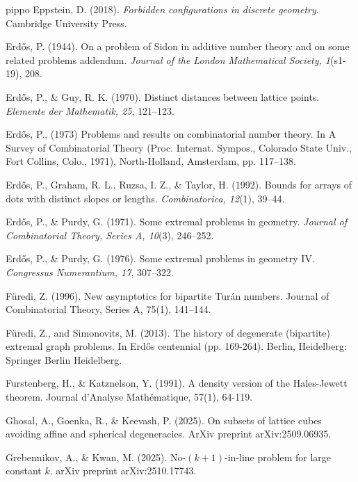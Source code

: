 \documentclass[11pt]{article}
\theoremstyle{plain}
\begin{document}
\begin{thebibliography}{pippo}
		 Eppstein, D. (2018). \textit{Forbidden configurations in discrete geometry}. Cambridge University Press.
		
		 Erdős, P. (1944). On a problem of Sidon in additive number theory and on some related problems addendum. \textit{Journal of the London Mathematical Society, 1}(s1-19), 208.
		
		 Erdős, P., \& Guy, R. K. (1970). Distinct distances between lattice points. \textit{Elemente der Mathematik, 25}, 121–123.
		
		 Erdős, P., (1973) Problems and results on combinatorial number theory. In A Survey of
		Combinatorial Theory (Proc. Internat. Sympos., Colorado State Univ., Fort Collins, Colo., 1971),
		North-Holland, Amsterdam, pp. 117–138.
		
		 Erdős, P., Graham, R. L., Ruzsa, I. Z., \& Taylor, H. (1992). Bounds for arrays of dots with distinct slopes or lengths. \textit{Combinatorica, 12}(1), 39–44. %
		
		 Erdős, P., \& Purdy, G. (1971). Some extremal problems in geometry. \textit{Journal of Combinatorial Theory, Series A, 10}(3), 246–252. %
		
		 Erdős, P., \& Purdy, G. (1976). Some extremal problems in geometry IV. \textit{Congressus Numerantium, 17}, 307–322.
		
		 Füredi, Z. (1996). New asymptotics for bipartite Turán numbers. Journal of Combinatorial Theory, Series A, 75(1), 141–144.
		
		 Füredi, Z., and Simonovits, M. (2013). The history of degenerate (bipartite) extremal graph problems. In Erdős centennial (pp. 169-264). Berlin, Heidelberg: Springer Berlin Heidelberg.
		
		 Furstenberg, H., \& Katznelson, Y. (1991). A density version of the Hales-Jewett theorem. Journal d’Analyse Mathématique, 57(1), 64-119.
		
		 Ghosal, A., Goenka, R., \& Keevash, P. (2025). On subsets of lattice cubes avoiding affine and spherical degeneracies. ArXiv preprint arXiv:2509.06935.
		
		
		 Grebennikov, A., \& Kwan, M. (2025). No-$(k+ 1) $-in-line problem for large constant $ k$. arXiv preprint arXiv:2510.17743.
		
		

\end{thebibliography}
\end{document}
